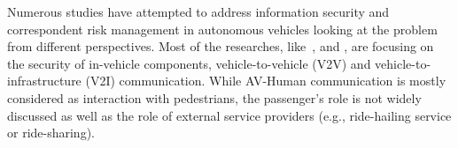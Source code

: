 \documentclass[manuscript]{acmart}
\begin{document}
Numerous studies have attempted to address information security and correspondent risk management in autonomous vehicles looking at the problem from different perspectives. Most of the researches, like~\cite{AVsecurity_AttacksDefTaxonomy_Thing_Wu}, \cite{CybSecChallengesInVehicularCom} and \cite{PotentialCyberAttacksOnAV}, are focusing on the security of in-vehicle components, vehicle-to-vehicle (V2V) and vehicle-to-infrastructure (V2I) communication. While AV-Human communication is mostly considered as interaction with pedestrians, the passenger's role is not widely discussed as well as the role of external service providers (e.g., ride-hailing service or ride-sharing). %
\end{document}
